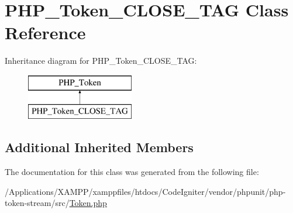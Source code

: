 \hypertarget{class_p_h_p___token___c_l_o_s_e___t_a_g}{}\section{P\+H\+P\+\_\+\+Token\+\_\+\+C\+L\+O\+S\+E\+\_\+\+T\+AG Class Reference}
\label{class_p_h_p___token___c_l_o_s_e___t_a_g}
Inheritance diagram for P\+H\+P\+\_\+\+Token\+\_\+\+C\+L\+O\+S\+E\+\_\+\+T\+AG\+:\begin{figure}[H]
\begin{center}
\leavevmode
\includegraphics[height=2.000000cm]{class_p_h_p___token___c_l_o_s_e___t_a_g}
\end{center}
\end{figure}
\subsection*{Additional Inherited Members}


The documentation for this class was generated from the following file\+:\begin{DoxyCompactItemize}
\item 
/\+Applications/\+X\+A\+M\+P\+P/xamppfiles/htdocs/\+Code\+Igniter/vendor/phpunit/php-\/token-\/stream/src/\mbox{\hyperlink{_token_8php}{Token.\+php}}\end{DoxyCompactItemize}
